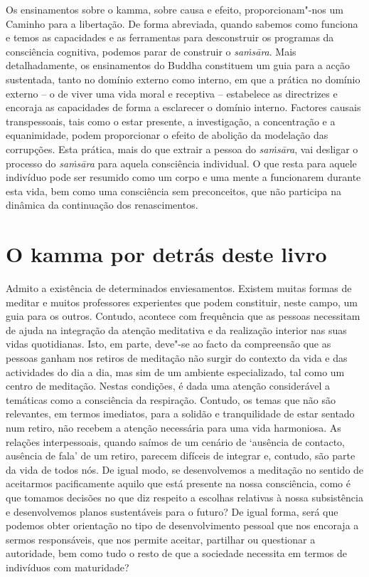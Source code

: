 Os ensinamentos sobre o kamma, sobre causa e efeito, proporcionam"-nos um Caminho
para a libertação. De forma abreviada, quando sabemos como funciona e temos as
capacidades e as ferramentas para desconstruir os programas da consciência
cognitiva, podemos parar de construir o \emph{saṁsāra}. Mais detalhadamente, os
ensinamentos do Buddha constituem um guia para a acção sustentada, tanto no
domínio externo como interno, em que a prática no domínio externo -- o de viver
uma vida moral e receptiva -- estabelece as directrizes e encoraja as
capacidades de forma a esclarecer o domínio interno. Factores causais
transpessoais, tais como o estar presente, a investigação, a concentração e a
equanimidade, podem proporcionar o efeito de abolição da modelação das
corrupções. Esta prática, mais do que extrair a pessoa do \emph{saṁsāra}, vai
desligar o processo do \emph{saṁsāra} para aquela consciência individual. O que
resta para aquele indivíduo pode ser resumido como um corpo e uma mente a
funcionarem durante esta vida, bem como uma consciência sem preconceitos, que
não participa na dinâmica da continuação dos renascimentos.

\section{O kamma por detrás deste livro}

Admito a existência de determinados enviesamentos. Existem muitas formas de
meditar e muitos professores experientes que podem constituir, neste campo, um
guia para os outros. Contudo, acontece com frequência que as pessoas necessitam
de ajuda na integração da atenção meditativa e da realização interior nas suas
vidas quotidianas. Isto, em parte, deve"-se ao facto da compreensão que as
pessoas ganham nos retiros de meditação não surgir do contexto da vida e das
actividades do dia a dia, mas sim de um ambiente especializado, tal como um
centro de meditação. Nestas condições, é dada uma atenção considerável a
temáticas como a consciência da respiração. Contudo, os temas que não são
relevantes, em termos imediatos, para a solidão e tranquilidade de estar sentado
num retiro, não recebem a atenção necessária para uma vida harmoniosa. As
relações interpessoais, quando saímos de um cenário de `ausência de contacto,
ausência de fala' de um retiro, parecem difíceis de integrar e, contudo, são
parte da vida de todos nós. De igual modo, se desenvolvemos a meditação no
sentido de aceitarmos pacificamente aquilo que está presente na nossa
consciência, como é que tomamos decisões no que diz respeito a escolhas
relativas à nossa subsistência e desenvolvemos planos sustentáveis para o
futuro? De igual forma, será que podemos obter orientação no tipo de
desenvolvimento pessoal que nos encoraja a sermos responsáveis, que nos permite
aceitar, partilhar ou questionar a autoridade, bem como tudo o resto de que a
sociedade necessita em termos de indivíduos com maturidade?

